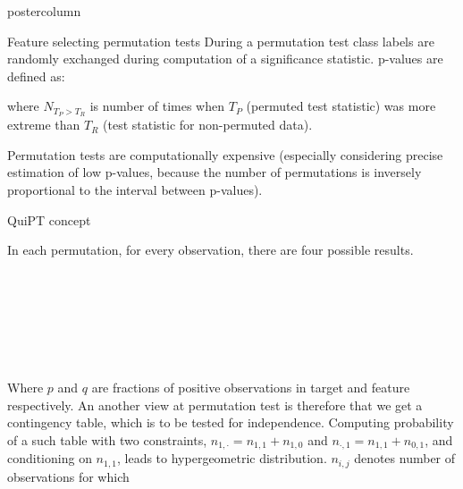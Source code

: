 \documentclass[final]{beamer}\usepackage[]{graphicx}\usepackage[]{color}
\begin{document}
\begin{frame}
\begin{columns}
\begin{column}{.47\textwidth}
\begin{beamercolorbox}[center,wd=\textwidth]{postercolumn}
\begin{minipage}[T]{.95\textwidth}
{\begin{block}{Feature selecting permutation tests}
    During a permutation test class labels are randomly exchanged during computation of a significance statistic. p-values are defined as:
    
\begin{center}
\end{center}

where $N_{T_P > T_R}$ is number of times when $T_P$ (permuted test statistic) was more extreme than $T_R$ (test statistic for non-permuted data).

Permutation tests are computationally expensive (especially considering precise estimation of low p-values, because the number of permutations is inversely proportional to the interval between p-values).
      
    \end{block}
    \vfill
    
    
\begin{block}{QuiPT concept}

In each permutation, for every observation, there are four possible results.

\begin{center}
\scalebox{0.85}{
$P(Target, Feature) = (1,1)) = p \cdot q$
}
\end{center}

\\

\begin{center}
\scalebox{0.85}{
$P(Target, Feature) = (1,0)) = p \cdot (1-q)$
}
\end{center}

\\

\begin{center}
\scalebox{0.85}{
$P(Target, Feature) = (0,1)) = (1-p) \cdot q$
}
\end{center}

\\

\begin{center}
\scalebox{0.85}{
$P(Target, Feature) = (0,0)) = (1-p) \cdot (1-q)$
}
\end{center}

\\

Where $p$ and $q$ are fractions of positive observations in target and
feature respectively. An another view at permutation test is therefore that we 
get a contingency table, which is to be tested for independence.
Computing probability of a such table with two constraints, $n_{1,\cdot} = n_{1,1} + n_{1,0}$ and
$n_{\cdot, 1} = n_{1,1} + n_{0,1}$, and 
conditioning on $n_{1,1}$, leads to hypergeometric distribution.
$n_{i,j}$ denotes number of observations for which 
\scalebox{0.85}{$(Target, Feature) = (i,j)$}


\end{block}}
\end{minipage}
\end{beamercolorbox}
\end{column}
\end{columns}
\end{frame}
\end{document}
